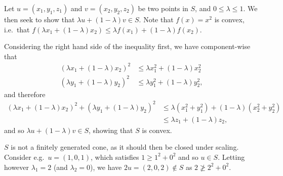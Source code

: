 \begin{solution}
  Let $u = (x_1, y_1, z_1)$ and $v = (x_2, y_2, z_2)$ be two points in $S$, and $0 \leq \lambda \leq 1$.
  We then seek to show that $\lambda u + (1 - \lambda) v \in S$.
  Note that $f(x) = x^2$ is convex, i.e.\ that $f(\lambda x_1 + (1 - \lambda) x_2) \leq \lambda f(x_1) + (1 - \lambda) f(x_2)$.

  Considering the right hand side of the inequality first, we have component-wise that
  \begin{equation}
    \begin{split}
      (\lambda x_1 + (1 - \lambda) x_2)^2 &\leq \lambda x_1^2 + (1 - \lambda) x_2^2 \\
      (\lambda y_1 + (1 - \lambda) y_2)^2 &\leq \lambda y_1^2 + (1 - \lambda) y_2^2,
    \end{split}
  \end{equation}
  and therefore
  \begin{equation}
    \begin{split}
      (\lambda x_1 + (1 - \lambda) x_2)^2 + (\lambda y_1 + (1 - \lambda) y_2)^2 &\leq \lambda (x_1^2 + y_1^2) + (1 - \lambda) (x_2^2 + y_2^2) \\
      &\leq \lambda z_1 + (1 - \lambda) z_2,
    \end{split}
  \end{equation}
  and so $\lambda u + (1 - \lambda) v \in S$, showing that $S$ is convex.

  $S$ is not a finitely generated cone, as it should then be closed under scaling.
  Consider e.g.\ $u = (1,0,1)$, which satisfies $1 \geq 1^2 + 0^2$ and so $u \in S$.
  Letting however $\lambda_1 = 2$ (and $\lambda_2 = 0$), we have $2u = (2,0,2) \notin S$ as $2 \not\geq 2^2 + 0^2$.
\end{solution}